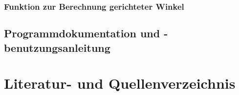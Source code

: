 \documentclass[reducespace,stylepage,semiarbeit]{spezidoc}
\begin{document}
\begin{equation*}
\begin{split}
\end{split}
\end{equation*}

\begin{subequations}
\begin{align}
\end{align}
\end{subequations}

\subsubsection*{Funktion zur Berechnung gerichteter Winkel}


\subsection{Programmdokumentation und -benutzungsanleitung}

\newpage
\nocite{*}
\section{Literatur- und Quellenverzeichnis}
\printbibliography[type=book, title=Buchquellen]
\printbibliography[type=online, title=Internetquellen]


\eidesstattlicheerklaerung
\end{document}
